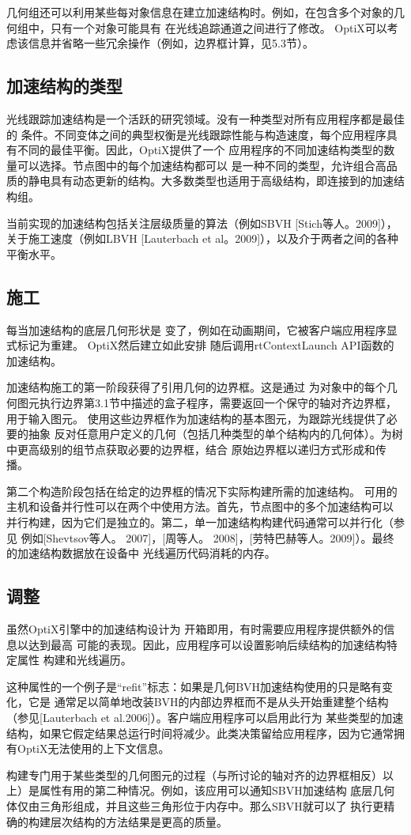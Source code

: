 几何组还可以利用某些每对象信息在建立加速结构时。例如，在包含多个对象的几何组中，只有一个对象可能具有
在光线追踪通道之间进行了修改。 OptiX可以考虑该信息并省略一些冗余操作（例如，边界框计算，见5.3节）。

\subsection{加速结构的类型}

光线跟踪加速结构是一个活跃的研究领域。没有一种类型对所有应用程序都是最佳的
条件。不同变体之间的典型权衡是光线跟踪性能与构造速度，每个应用程序具有不同的最佳平衡。因此，OptiX提供了一个
应用程序的不同加速结构类型的数量可以选择。节点图中的每个加速结构都可以
是一种不同的类型，允许组合高品质的静电具有动态更新的结构。大多数类型也适用于高级结构，即连接到的加速结构组。

当前实现的加速结构包括关注层级质量的算法（例如SBVH [Stich等人。2009]），
关于施工速度（例如LBVH [Lauterbach et al。2009]），以及介于两者之间的各种平衡水平。

\subsection{施工}

每当加速结构的底层几何形状是
变了，例如在动画期间，它被客户端应用程序显式标记为重建。 OptiX然后建立如此安排
随后调用rtContextLaunch API函数的加速结构。

加速结构施工的第一阶段获得了引用几何的边界框。这是通过
为对象中的每个几何图元执行边界第3.1节中描述的盒子程序，需要返回一个保守的轴对齐边界框，用于输入图元。
使用这些边界框作为加速结构的基本图元，为跟踪光线提供了必要的抽象
反对任意用户定义的几何（包括几种类型的单个结构内的几何体）。为树中更高级别的组节点获取必要的边界框，结合
原始边界框以递归方式形成和传播。

第二个构造阶段包括在给定的边界框的情况下实际构建所需的加速结构。
可用的主机和设备并行性可以在两个中使用方法。首先，节点图中的多个加速结构可以
并行构建，因为它们是独立的。第二，单一加速结构构建代码通常可以并行化（参见
例如[Shevtsov等人。 2007]，[周等人。 2008]，[劳特巴赫等人。2009]）。最终的加速结构数据放在设备中
光线遍历代码消耗的内存。

\subsection{调整}

虽然OptiX引擎中的加速结构设计为
开箱即用，有时需要应用程序提供额外的信息以达到最高
可能的表现。因此，应用程序可以设置影响后续结构的加速结构特定属性
构建和光线遍历。

这种属性的一个例子是“refit”标志：如果是几何BVH加速结构使用的只是略有变化，它是
通常足以简单地改装BVH的内部边界框而不是从头开始重建整个结构（参见[Lauterbach et al.2006]）。客户端应用程序可以启用此行为
某些类型的加速结构，如果它假定结果总运行时间将减少。此类决策留给应用程序，因为它通常拥有OptiX无法使用的上下文信息。

构建专门用于某些类型的几何图元的过程（与所讨论的轴对齐的边界框相反）以上）是属性有用的第二种情况。例如，该应用可以通知SBVH加速结构
底层几何体仅由三角形组成，并且这些三角形位于内存中。那么SBVH就可以了
执行更精确的构建层次结构的方法结果是更高的质量。